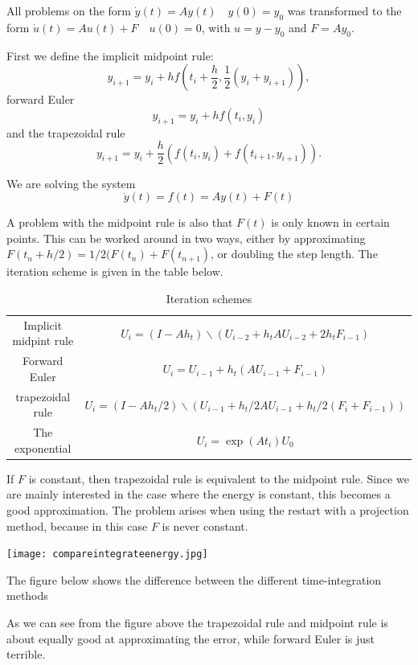 All problems on the form $ \dot{y}(t) = Ay(t) \quad y(0) = y_0 $ was transformed to the form $ \dot{u}(t) = Au(t) + F \quad u(0) = 0 $, with $u = y-y_0 $ and $F = A y_0$.

First we define the implicit midpoint rule:
$$ y_{i+1} = y_i + hf\left(t_i+\frac{h}{2},\frac12 (y_i+y_{i+1})\right), $$
forward Euler
 $$ y_{i+1} = y_i + h f(t_i,y_i) $$
and the trapezoidal rule
$$ y_{i+1} = y_i +  \frac{h}{2} (f(t_i,y_i) + f(t_{i+1},y_{i+1})). $$ 


We are solving the system 
$$ \dot{y}(t) = f(t) =  Ay(t) + F(t) $$

A problem with the midpoint rule is also that $F(t)$ is only known in certain points. This can be worked around in two ways, either by approximating $F(t_n+h/2) = 1/2( F(t_n) + F(t_{n+1})$, or doubling the step length. %
The iteration scheme is given in the table below.

\begin{table}[]
\centering
\begin{tabular}{c|c}
Implicit midpint rule &  $ U_i= ( I - A h_t )\backslash( U_{i-2} + h_t A U_{i-2} + 2 h_t F_{i-1} ) $\\
Forward Euler & $ U_{i} = U_{i-1} + h_t ( A U_{i-1} + F_{i-1} ) $ \\
trapezoidal rule & $U_i = ( I - A h_t/2 )\backslash(U_{i-1} + h_t/2 A U_{i-1}+h_t/2 (F_i+F_{i-1}))$ \\
The exponential & $ U_i  = \exp(A t_i) U_0$
\end{tabular}
\caption{Iteration schemes}
\label{tab:my_label}
\end{table}
If $F$ is constant, then trapezoidal rule is equivalent to the midpoint rule. Since we are mainly interested in the case where the energy is constant, this becomes a good approximation. The problem arises when using the restart with a projection method, because in this case $F$ is never constant.



\texttt{[image: compareintegrateenergy.jpg]}

The figure below shows the difference between the different time-integration methods


As we can see from the figure above the trapezoidal rule and midpoint rule is about equally good at approximating the error, while forward Euler is just terrible.


